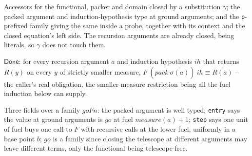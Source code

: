 \begin{definition}
\label{vpc:def:probebundle-closed}
\leanok
{}

 Accessors for the functional, packer and domain closed by a substitution
$\gamma$; the packed argument and induction-hypothesis type at ground arguments; and the
\texttt{p}-prefixed family giving the same inside a probe, together with its context and the
closed equation's left side. The recursion arguments are already closed, being literals, so
$\gamma$ does not touch them.
\end{definition}

\begin{definition}
\label{vpc:def:probebundle-done}\leanok
{}

 $\mathsf{Done}$: for every recursion argument $a$ and induction hypothesis
$\mathit{ih}$ that returns $\overline{R(y)}$ on every $y$ of strictly smaller measure, $F\
(\mathit{pack}\ \overline{\sigma(a)})\ \mathit{ih} \equiv \overline{R(a)}$ -- the caller's real
obligation, the smaller-measure restriction being all the fuel induction below can supply.
\end{definition}

\begin{definition}
\label{vpc:struct:natfixunfold}\leanok
\uses{vpc:def:probebundle-closed}

 Three fields over a family $\mathit{goFn}$: the packed argument is well typed;
\texttt{entry} says the value at ground arguments is $\mathit{go}$ at fuel
$\mathit{measure}(a)+1$; \texttt{step} says one unit of fuel buys one call to $F$ with recursive
calls at the lower fuel, uniformly in a base point $b$; $\mathit{go}$ is a family since closing
the telescope at different arguments may leave different terms, only the functional being
telescope-free.
\end{definition}

